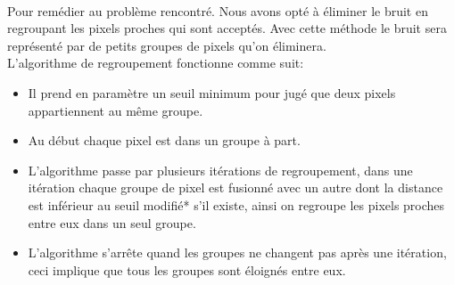 \documentclass[12pt]{report}
\begin{document}
	\paragraph{}Pour remédier au problème rencontré. Nous avons opté à éliminer le bruit en regroupant les pixels proches qui sont acceptés. Avec cette méthode le bruit sera représenté par de petits groupes de pixels qu'on éliminera.\\
	L’algorithme de regroupement fonctionne comme suit:
	\begin{itemize}
		\item Il prend en paramètre un seuil minimum pour jugé que deux pixels appartiennent au même groupe.
		
		\item Au début chaque pixel est dans un groupe à part.
		
		\item L’algorithme passe par plusieurs itérations de regroupement, dans une itération chaque groupe de pixel est fusionné avec un autre dont la distance est inférieur au seuil modifié* s'il existe, ainsi on regroupe les pixels proches entre eux dans un seul groupe.
		
		\item L’algorithme s’arrête quand les groupes ne changent pas après une itération, ceci implique que tous les groupes sont éloignés entre eux.
	\end{itemize}
\end{document}
